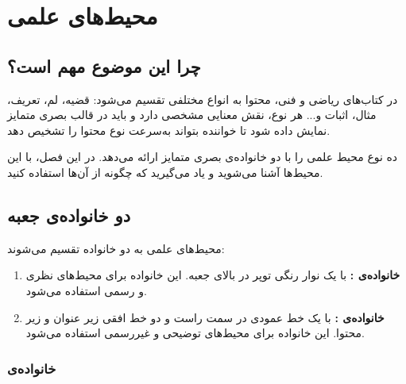 
\chapter{محیط‌های علمی}
\label{chap:environments}

\section{چرا این موضوع مهم است؟}
\label{sec:environments-why}

در کتاب‌های ریاضی و فنی، محتوا به انواع مختلفی
تقسیم می‌شود: قضیه، لم، تعریف، مثال، اثبات و...
هر نوع، نقش معنایی مشخصی دارد و باید در قالب
بصری متمایز نمایش داده شود تا خواننده بتواند
به‌سرعت نوع محتوا را تشخیص دهد.

 ده نوع محیط علمی را با دو خانواده‌ی
بصری متمایز ارائه می‌دهد. در این فصل، با این
محیط‌ها آشنا می‌شوید و یاد می‌گیرید که چگونه
از آن‌ها استفاده کنید.


\section{دو خانواده‌ی جعبه}
\label{sec:environments-families}

محیط‌های علمی  به دو خانواده
تقسیم می‌شوند:

\begin{enumerate}
    \item \textbf{خانواده‌ی :}
    با یک نوار رنگی توپر در بالای جعبه. این
    خانواده برای محیط‌های نظری و رسمی استفاده
    می‌شود.
    \item \textbf{خانواده‌ی :}
    با یک خط عمودی در سمت راست و دو خط افقی
    زیر عنوان و زیر محتوا. این خانواده برای
    محیط‌های توضیحی و غیررسمی استفاده می‌شود.
\end{enumerate}


\subsection{خانواده‌ی }
\label{sec:environments-matinbox}

